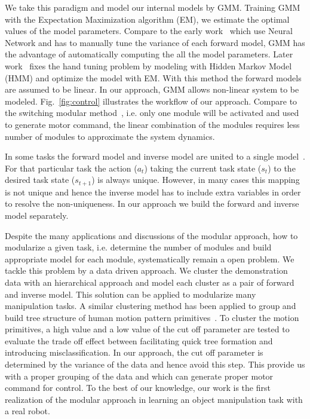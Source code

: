 We take this paradigm and model our internal models by GMM. Training GMM with the Expectation Maximization algorithm (EM), we estimate the optimal values of the model parameters. Compare to the early work~\cite{wolpert1998multiple} which use Neural Network and has to manually tune the variance of each forward model, GMM has the advantage of automatically computing the all the model parameters. Later work~\cite{haruno2001mosaic} fixes the hand tuning problem by modeling with Hidden Markov Model (HMM) and optimize the model with EM. With this method the forward models are assumed to be linear. In our approach, GMM allows non-linear system to be modeled. Fig.~\ref{fig:control} illustrates the workflow of our approach. Compare to the switching modular method~\cite{narendra1997adaptive}, i.e. only one module will be activated and used to generate motor command, the linear combination of the modules requires less number of modules to approximate the system dynamics.


In some tasks the forward model and inverse model are united to a single model~\cite{petkos2006learning}. For that particular task the action ($a_t$) taking the current task state ($s_t$) to the desired task state ($s_{t+1}$) is always unique. However, in many cases this mapping is not unique and hence the inverse model has to include extra variables in order to resolve the non-uniqueness. In our approach we build the forward and inverse model separately.

Despite the many applications and discussions of the modular approach, how to modularize a given task, i.e. determine the number of modules and build appropriate model for each module, systematically remain a open problem. We tackle this problem by a data driven approach. We cluster the demonstration data with an hierarchical approach and model each cluster as a pair of forward and inverse model. This solution can be applied to modularize many manipulation tasks. A similar clustering method has been applied to group and build tree structure of human motion pattern primitives~\cite{kulic2008incremental}. To cluster the motion primitives, a high value and a low value of the cut off parameter are tested to evaluate the trade off effect between facilitating quick tree formation and introducing misclassification. In our approach, the cut off parameter is determined by the variance of the data and hence avoid this step. This provide us with a proper grouping of the data and which can generate proper motor command for control. To the best of our knowledge, our work is the first realization of the modular approach in learning an object manipulation task with a real robot.

